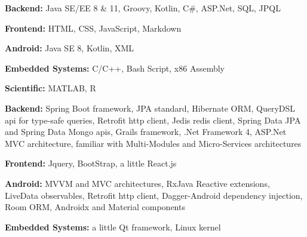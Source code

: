 

\begin{cvskills}

\cvskill
  {} %
  { %
    \begin{cvitems} %
      \item {\textbf{Backend:} Java SE/EE 8 \& 11, Groovy, Kotlin, C\#, ASP.Net, SQL, JPQL}
      \item {\textbf{Frontend:} HTML, CSS, JavaScript, Markdown}
      \item {\textbf{Android:} Java SE 8, Kotlin, XML}
      \item {\textbf{Embedded Systems:} C/C++, Bash Script, x86 Assembly}
      \item {\textbf{Scientific:} MATLAB, R}
    \end{cvitems}
  } 
  
\cvskill
  {} %
  { %
    \begin{cvitems} %
      \item {\textbf{Backend:} Spring Boot framework, JPA standard, Hibernate ORM, QueryDSL api for type-safe queries, Retrofit http client, Jedis redis client, Spring Data JPA and Spring Data Mongo apis, Grails framework, .Net Framework 4, ASP.Net MVC architecture, familiar with Multi-Modules and Micro-Services architectures}
      \item {\textbf{Frontend:} Jquery, BootStrap, a little React.js}
      \item {\textbf{Android:} MVVM and MVC architectures, RxJava Reactive extensions, LiveData observables, Retrofit http client, Dagger-Android dependency injection, Room ORM, Androidx and Material components}
      \item {\textbf{Embedded Systems:} a little Qt framework, Linux kernel}
    \end{cvitems}
  }


\end{cvskills}
